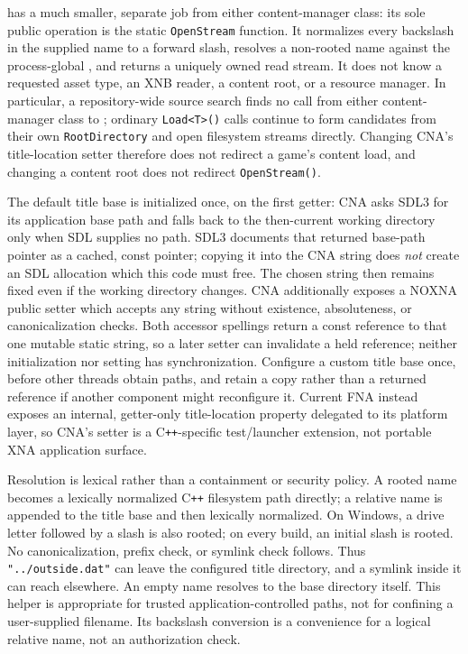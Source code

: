  has a much smaller, separate job from either content-manager class:
its sole public operation is the static \texttt{OpenStream} function. It normalizes every
backslash in the supplied name to a forward slash, resolves a non-rooted name against the
process-global , and returns a uniquely owned read stream. It does not
know a requested asset type, an XNB reader, a content root, or a resource manager. In particular,
a repository-wide source search finds no call from either content-manager class to
; ordinary  \texttt{Load<T>()} calls continue
to form candidates from their own \texttt{RootDirectory} and open filesystem streams directly.
Changing CNA's title-location setter therefore does not redirect a game's content load, and
changing a content root does not redirect \texttt{OpenStream()}.

The default title base is initialized once, on the first getter: CNA asks SDL3 for its application
base path and falls back to the then-current working directory only when SDL supplies no path. SDL3
documents that returned base-path pointer as a cached, const pointer; copying it into the CNA
string does \emph{not} create an SDL allocation which this code must free. The chosen string then
remains fixed even if the working directory changes. CNA additionally exposes a NOXNA public
setter which accepts any string without existence, absoluteness, or canonicalization checks. Both
accessor spellings return a const reference to that one mutable static string, so a later setter
can invalidate a held reference; neither initialization nor setting has synchronization. Configure
a custom title base once, before other threads obtain paths, and retain a copy rather than a
returned reference if another component might reconfigure it. Current FNA instead exposes an
internal, getter-only title-location property delegated to its platform layer, so CNA's setter is
a C\texttt{++}-specific test/launcher extension, not portable XNA application surface.

Resolution is lexical rather than a containment or security policy. A rooted name becomes a
lexically normalized C\texttt{++} filesystem path directly; a relative name is appended to the
title base and then lexically normalized. On Windows, a drive letter followed by a slash is also
rooted; on every build, an initial slash is rooted. No canonicalization, prefix check, or symlink
check follows. Thus \texttt{"../outside.dat"} can leave the configured title directory, and a
symlink inside it can reach elsewhere. An empty name resolves to the base directory itself. This
helper is appropriate for trusted application-controlled paths, not for confining a user-supplied
filename. Its backslash conversion is a convenience for a logical relative name, not an
authorization check.

